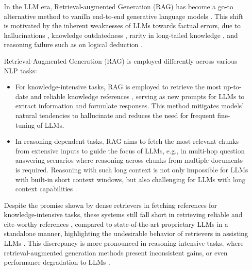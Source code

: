 \documentclass{article} %
\begin{document}
In the LLM era, Retrieval-augmented Generation (RAG) \citep{lewis2020retrieval,neelakantan2022text,xu2023retrieval,gao2023retrieval} has become a go-to alternative method to vanilla end-to-end generative language models \citep{gpt4,touvron2023llama}. This shift is motivated by the inherent weaknesses of LLMs towards factual errors, due to hallucinations \citep{ji2023survey}, knowledge outdatedness \citep{vu2023freshllms}, rarity in long-tailed knowledge \citep{kandpal2023large,malaviya2023expertqa}, and reasoning failure such as on logical deduction \citep{berglund2023reversal}.

Retrieval-Augmented Generation (RAG) is employed differently across various NLP tasks:

\begin{itemize}
    \item For knowledge-intensive tasks, RAG is employed to retrieve the most up-to-date and reliable knowledge references \citep{vu2023freshllms, malaviya2023expertqa}, serving as new prompts for LLMs to extract information and formulate responses. This method mitigates models' natural tendencies to hallucinate \citep{ji2023survey} and reduces the need for frequent fine-tuning of LLMs.
    \item In reasoning-dependent tasks, RAG aims to fetch the most relevant chunks from extensive inputs to guide the focus of LLMs, e.g., in multi-hop question answering scenarios where reasoning across chunks from multiple documents is required. Reasoning with such long context is not only impossible for LLMs with built-in short context windows, but also challenging for LLMs with long context capabilities \citep{xu2023retrieval}.
\end{itemize}

Despite the promise shown by dense retrievers in fetching references for knowledge-intensive tasks, these systems still fall short in retrieving reliable and cite-worthy references \citep{malaviya2023expertqa}, compared to state-of-the-art proprietary LLMs \citep{gpt4} in a standalone manner, highlighting the undesirable behavior of retrievers in assisting LLMs \citep{behnamghader-etal-2023-retriever,asai2024reliable}. This discrepancy is more pronounced in reasoning-intensive tasks, where retrieval-augmented generation methods present inconsistent gains, or even performance degradation to LLMs \citep{bai2023longbench,xu2023retrieval}. 

\end{document}
